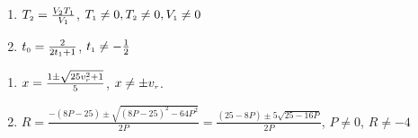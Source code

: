 \documentclass{ximera}
\begin{document}
\begin{multicols}{2}
\begin{enumerate}
\setcounter{enumi}{\value{HW}}

\item $T_{\text{\tiny $2$}} = \frac{V_{\text{\tiny $2$}}T_{\text{\tiny $1$}}}{V_{\text{\tiny $1$}}}$, $T_{\text{\tiny $1$}} \neq 0, T_{\text{\tiny $2$}} \neq 0, V_{\text{\tiny $1$}} \neq 0$


\item  $t_{\text{\tiny $0$}} = \frac{2}{2t_{\text{\tiny $1$}} + 1}$, $t_{\text{\tiny $1$}} \neq -\frac{1}{2}$

\setcounter{HW}{\value{enumi}}
\end{enumerate}
\end{multicols}

\begin{enumerate}
\setcounter{enumi}{\value{HW}}


\item  $x = \frac{1 \pm \sqrt{25v_{\text{\tiny $r$}}^2+1}}{5}$, $x \neq \pm v_{\text{\tiny $r$}}$.

\item $R= \frac{-(8P-25) \pm \sqrt{(8P-25)^2 - 64P^2}}{2P} = \frac{(25-8P) \pm 5 \sqrt{25-16P}}{2P}$, $P \neq 0$, $R \neq -4$

\setcounter{HW}{\value{enumi}}
\end{enumerate}
\end{document}
